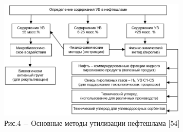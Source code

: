 \begin{figure}[H]
	\centering
	\includegraphics[width=0.8\textwidth]{media/chem2/image67}
	\caption*{Рис.4 − Основные методы утилизации нефтешлама {[}54{]}}
\end{figure}

